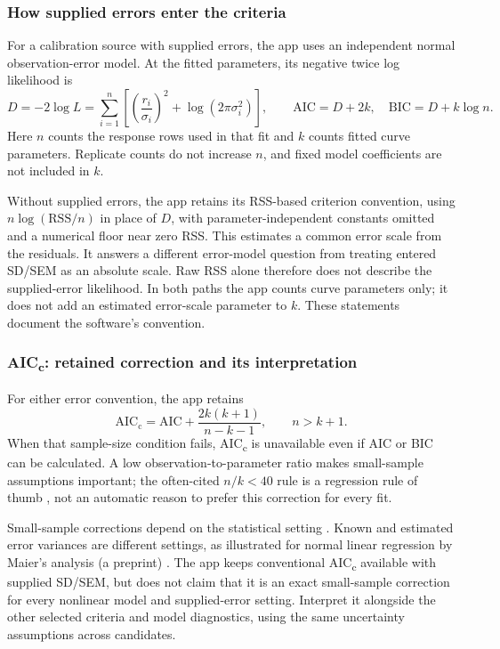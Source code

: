 \subsubsection*{How supplied errors enter the criteria}

For a calibration source with supplied errors, the app uses an independent normal observation-error model. At the fitted parameters, its negative twice log likelihood is
\[
D=-2\log L=\sum_{i=1}^{n}\left[\left(\frac{r_i}{\sigma_i}\right)^2
  +\log(2\pi\sigma_i^2)\right],
\qquad \mathrm{AIC}=D+2k,\quad \mathrm{BIC}=D+k\log n.
\]
Here $n$ counts the response rows used in that fit and $k$ counts fitted curve parameters. Replicate counts do not increase $n$, and fixed model coefficients are not included in $k$.

Without supplied errors, the app retains its RSS-based criterion convention, using $n\log(\mathrm{RSS}/n)$ in place of $D$, with parameter-independent constants omitted and a numerical floor near zero RSS. This estimates a common error scale from the residuals. It answers a different error-model question from treating entered SD/SEM as an absolute scale. Raw RSS alone therefore does not describe the supplied-error likelihood. In both paths the app counts curve parameters only; it does not add an estimated error-scale parameter to $k$. These statements document the software's convention.

\subsubsection*{AIC\textsubscript{c}: retained correction and its interpretation}

For either error convention, the app retains
\[
\mathrm{AIC}_{\mathrm{c}}=\mathrm{AIC}+\frac{2k(k+1)}{n-k-1},
\qquad n>k+1.
\]
When that sample-size condition fails, AIC\textsubscript{c} is unavailable even if AIC or BIC can be calculated. A low observation-to-parameter ratio makes small-sample assumptions important; the often-cited $n/k<40$ rule is a regression rule of thumb \cite{burnham2002}, not an automatic reason to prefer this correction for every fit.

Small-sample corrections depend on the statistical setting \cite{hurvich1989}. Known and estimated error variances are different settings, as illustrated for normal linear regression by Maier's analysis (a preprint) \cite{maier2013}. The app keeps conventional AIC\textsubscript{c} available with supplied SD/SEM, but does not claim that it is an exact small-sample correction for every nonlinear model and supplied-error setting. Interpret it alongside the other selected criteria and model diagnostics, using the same uncertainty assumptions across candidates.

